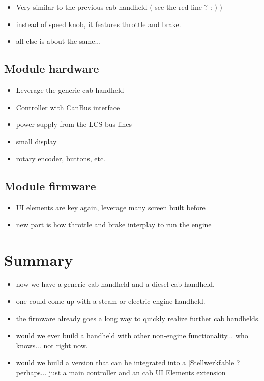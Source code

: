 \begin{itemize}
\item Very similar to the previous cab handheld ( see the red line ? :-) )
\item instead of speed knob, it features throttle and brake.
\item all else is about the same...
\end{itemize}

\subsection{Module hardware}

\begin{itemize}
\item Leverage the generic cab handheld
\item Controller with CanBus interface
\item power supply from the LCS bus lines
\item small display
\item rotary encoder, buttons, etc.
\end{itemize}

\subsection{Module firmware}

\begin{itemize}
\item UI elements are key again, leverage many screen built before
\item new part is how throttle and brake interplay to run the engine
\end{itemize}


\section{Summary}

\begin{itemize}
\item now we have a generic cab handheld and a diesel cab handheld.
\item one could come up with a steam or electric engine handheld. 
\item the firmware already goes a long way to quickly realize further cab handhelds.
\item would we ever build a handheld with other non-engine functionality... who knows... not right now.
\item would we build a version that can be integrated into a |\"Stellwerk\" table ? perhaps... just a main controller and an cab UI Elements extension
\end{itemize}

